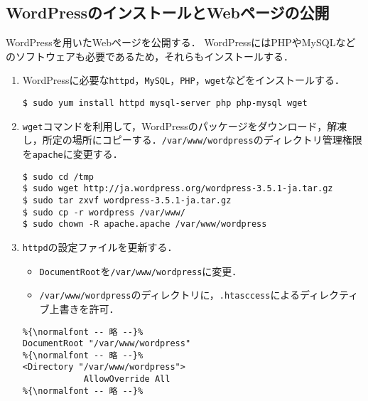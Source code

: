 \subsection{WordPressのインストールとWebページの公開}
WordPressを用いたWebページを公開する．
WordPressにはPHPやMySQLなどのソフトウェアも必要であるため，それらもインストールする．
\begin{enumerate}
    \item WordPressに必要な\texttt{httpd}，\texttt{MySQL}，\texttt{PHP}，\texttt{wget}などをインストールする．
          \begin{lstlisting}
$ sudo yum install httpd mysql-server php php-mysql wget
\end{lstlisting}
    \item \texttt{wget}コマンドを利用して，WordPressのパッケージをダウンロード，解凍し，所定の場所にコピーする．\texttt{/var/www/wordpress}のディレクトリ管理権限を\texttt{apache}に変更する．
          \begin{lstlisting}
$ sudo cd /tmp
$ sudo wget http://ja.wordpress.org/wordpress-3.5.1-ja.tar.gz
$ sudo tar zxvf wordpress-3.5.1-ja.tar.gz 
$ sudo cp -r wordpress /var/www/
$ sudo chown -R apache.apache /var/www/wordpress
    \end{lstlisting}
    \item \texttt{httpd}の設定ファイルを更新する．
          \begin{itemize}
              \item \texttt{DocumentRoot}を\texttt{/var/www/wordpress}に変更．
              \item \texttt{/var/www/wordpress}のディレクトリに，\texttt{.htasccess}によるディレクティブ上書きを許可．
          \end{itemize}
          \begin{lstlisting}
%{\normalfont -- 略 --}%
DocumentRoot "/var/www/wordpress"            
%{\normalfont -- 略 --}%
<Directory "/var/www/wordpress">
            AllowOverride All
%{\normalfont -- 略 --}%
          \end{lstlisting}
\end{enumerate}